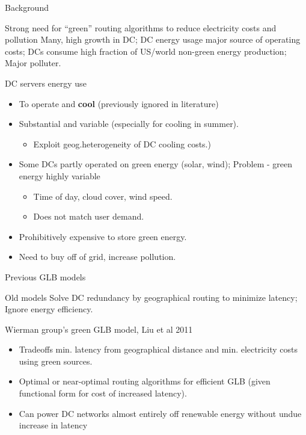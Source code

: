 \documentclass[xcolor=dvipsnames]{beamer}
\begin{document}
\begin{frame}{Background}

	\begin{block}{Strong need for “green” routing algorithms to reduce electricity costs and pollution} 
		Many, high growth in DC; DC energy usage major source of operating costs; DCs consume high fraction of US/world non-green energy production; Major polluter.
	\end{block}

	\begin{block}{DC servers energy use} \vspace{-1mm}
		\begin{itemize}
		          \item{To operate and \textbf{cool} (previously ignored in literature)}
			\item{Substantial and variable (especially for cooling in summer). \\ %
				\begin{itemize} \item{Exploit geog.heterogeneity of DC cooling costs.) } \end{itemize}
				}
			\item{Some DCs partly operated on green energy (solar, wind); Problem - green energy highly variable 
				\begin{itemize} \item{Time of day, cloud cover, wind speed.}
					               \item{Does not match user demand. }
				\end{itemize} }
			\item{Prohibitively expensive to store green energy.}
			\item{Need to buy off of grid, increase pollution.}
		\end{itemize}
	\end{block}

\end{frame}

\begin{frame}{Previous GLB models}

	\begin{block}{Old models}
		Solve DC redundancy by geographical routing to minimize latency; Ignore energy efficiency.
	\end{block}

	\begin{block}{Wierman group's green GLB model, Liu et al 2011 } %
		\begin{itemize}
			\item{Tradeoffs min. latency from geographical distance and min. electricity costs using green sources.}
			\item{Optimal or near-optimal  routing algorithms for efficient GLB (given functional form for cost of increased latency).}
			\item{Can power DC networks almost entirely off renewable energy without undue increase in latency} 
		\end{itemize}
	\end{block}  	
\end{frame}
\end{document}
